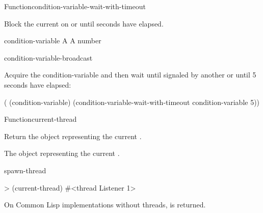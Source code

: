 \documentclass[10pt,twoside,english,pdftex]{article}
\begin{document}
\begin{functiondoc}{Function}{condition-variable-wait-with-timeout}%
  {}
%

\fnsyntax

\fnpurpose Block the current  on  or until
 seconds have elapsed.

\fnpackage {}

\fnmodule {}

\fnargs
\begin{args}{condition-variable}
 A 
\arg[seconds] A number
\end{args}

\fnerrors
\nocvlock{}
\par
\nothreads{}

\begin{alsos}{condition-variable-broadcast}
\end{alsos}

%
\fnexample Acquire the condition-variable  and then wait until
signaled by another  or until 5 seconds have elapsed:
\begin{example}
  ( (condition-variable)
    (condition-variable-wait-with-timeout condition-variable 5))
\end{example}

\end{functiondoc}


\begin{functiondoc}{Function}{current-thread}{\noargs{} 
    \returns{} }
%

\fnsyntax

\fnpurpose Return the object representing the current .

\fnpackage {}

\fnmodule {}

\fnreturns The object representing the current . 

\begin{alsos}{spawn-thread}
\end{alsos}

\fnexample
\begin{example}
> (current-thread)
#<thread Listener 1>
\end{example}

\fnnotes On Common Lisp implementations without threads, \nil{} is returned.

\end{functiondoc}
\end{document}
